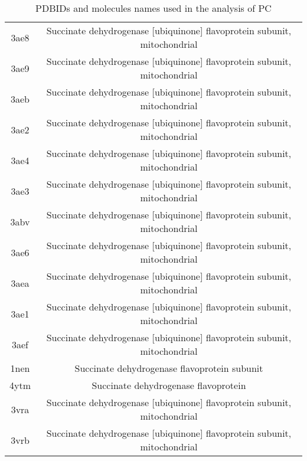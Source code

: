 \documentclass{article}
\begin{document}
\begin{table}[]
\begin{tabular}{c|c}
3ae8 & Succinate dehydrogenase [ubiquinone] flavoprotein subunit, mitochondrial \\ 
3ae9 & Succinate dehydrogenase [ubiquinone] flavoprotein subunit, mitochondrial \\ 
3aeb & Succinate dehydrogenase [ubiquinone] flavoprotein subunit, mitochondrial \\ 
3ae2 & Succinate dehydrogenase [ubiquinone] flavoprotein subunit, mitochondrial \\ 
3ae4 & Succinate dehydrogenase [ubiquinone] flavoprotein subunit, mitochondrial \\ 
3ae3 & Succinate dehydrogenase [ubiquinone] flavoprotein subunit, mitochondrial \\ 
3abv & Succinate dehydrogenase [ubiquinone] flavoprotein subunit, mitochondrial \\ 
3ae6 & Succinate dehydrogenase [ubiquinone] flavoprotein subunit, mitochondrial \\ 
3aea & Succinate dehydrogenase [ubiquinone] flavoprotein subunit, mitochondrial \\ 
3ae1 & Succinate dehydrogenase [ubiquinone] flavoprotein subunit, mitochondrial \\ 
3aef & Succinate dehydrogenase [ubiquinone] flavoprotein subunit, mitochondrial \\ 
1nen & Succinate dehydrogenase flavoprotein subunit \\ 
4ytm & Succinate dehydrogenase flavoprotein \\ 
3vra & Succinate dehydrogenase [ubiquinone] flavoprotein subunit, mitochondrial \\ 
3vrb & Succinate dehydrogenase [ubiquinone] flavoprotein subunit, mitochondrial \\ 
    \end{tabular}
    \caption{PDBIDs and molecules names used in the analysis of PC}
    \label{tab:my_label}
\end{table}
\end{document}
